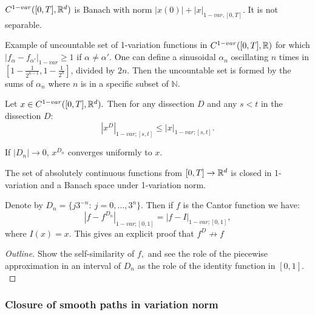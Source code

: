 \begin{theorem}
    $C^{1-var}([0,T], \mathbb{R}^d)$ is Banach with norm $|x(0)| + |x|_{1-var, [0,T]}.$ It is not separable.
\end{theorem}

\begin{example}
    Example of uncountable set of 1-variation functions in $C^{1-var}([0,T], \mathbb{R})$ for which $|f_\alpha - f_{\alpha'}|_{1-var} \geq 1$ if $\alpha \neq \alpha'.$
    One can define a sinusoidal $\alpha_n$ oscillating $n$ times in $[1-\frac{1}{2^{n-1}}, 1 - \frac{1}{2^n}]$, divided by $2n.$ 
    Then the uncountable set is formed by the sums of $\alpha_n$ where $n$ is in a specific subset of $\mathbb{N}.$
\end{example}

\begin{proposition}
    Let $x \in C^{1-var}([0,T], \mathbb{R}^d).$ Then for any dissection $D$ and any $s < t$ in the dissection $D:$
    \begin{equation}
        |x^D|_{1-var; [s,t]} \leq |x|_{1-var; [s,t]}.
    \end{equation}

    If $|D_n| \rightarrow 0$, $x^{D_n}$ converges uniformly to $x$.
\end{proposition}

\begin{proposition}
    The set of absolutely continuous functions from $[0,T] \rightarrow \mathbb{R}^d$ is closed in 1-variation and a Banach space under 1-variation norm.
\end{proposition}

\begin{example}
    Denote by $D_n = \{ j 3^{-n}:\ j = 0, \ldots, 3^n \}.$ Then if $f$ is the Cantor function we have:
    \begin{equation}
        |f - f^{D_n}|_{1-var; [0,1]} = |f - I|_{1-var; [0,1]},
    \end{equation}
    where $I(x)=x.$ This gives an explicit proof that $f^D \not \rightarrow f$
\end{example}
\begin{proof}[Outline]
    Show the self-similarity of $f,$ and see the role of the piecewise approximation in an interval of $D_n$ as the role of the identity function in $[0,1].$
\end{proof}

\subsubsection{Closure of smooth paths in variation norm}

